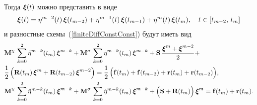 Тогда  $\boldsymbol{\mathbf{\xi}}(t)$ можно представить в виде
\begin{equation*}
	\boldsymbol{\mathbf{\xi}}(t) = \eta^{m-2}(t) \, \boldsymbol{\mathbf{\xi}}(t_{m-2}) + \eta^{m-1}(t) \, \boldsymbol{\mathbf{\xi}}(t_{m-1}) + \eta^{m}(t) \, \boldsymbol{\mathbf{\xi}}(t_{m}), \quad t \in \left[ t_{m-2}, \, t_{m} \right]
\end{equation*} 
и разностные схемы~(\ref{finiteDiffConstConst}) будут иметь вид
\begin{subequations}
	\label{finiteDiffConst}
	\begin{align}
		&
		\boldsymbol{\mathbf{M}}^\chi \, \sum_{k=0}^2 \ddot{\eta}^{m-k}(t_m) \, \boldsymbol{\mathbf{\xi}}^{m-k} +
		\boldsymbol{\mathbf{M}}^\sigma \, \sum_{k=0}^2 \dot{\eta}^{m-k}(t_m) \, \boldsymbol{\mathbf{\xi}}^{m-k} +
		\boldsymbol{\mathbf{S}} \, \frac{\boldsymbol{\mathbf{\xi}}^m + \boldsymbol{\mathbf{\xi}}^{m-2}}{2} + \nonumber \\
		&
		\frac{1}{2} \, \Big( \boldsymbol{\mathbf{R}}(t_m) \, \boldsymbol{\mathbf{\xi}}^m + \boldsymbol{\mathbf{R}}(t_{m-2}) \, \boldsymbol{\mathbf{\xi}}^{m-2} \Big)
		= 
		\frac{1}{2} \, \Big( \boldsymbol{\mathbf{f}}(t_m) + \boldsymbol{\mathbf{f}}(t_{m-2}) + \boldsymbol{\mathbf{r}}(t_m) + \boldsymbol{\mathbf{r}}(t_{m-2}) \Big), \label{CN3} \\
		&
		\boldsymbol{\mathbf{M}}^\chi \, \sum_{k=0}^2 \ddot{\eta}^{m-k}(t_m) \, \boldsymbol{\mathbf{\xi}}^{m-k} +
		\boldsymbol{\mathbf{M}}^\sigma \, \sum_{k=0}^2 \dot{\eta}^{m-k}(t_m) \, \boldsymbol{\mathbf{\xi}}^{m-k} +
		\Big( \boldsymbol{\mathbf{S}} + \boldsymbol{\mathbf{R}}(t_m) \Big) \, \boldsymbol{\mathbf{\xi}}^m 
		= 
		\boldsymbol{\mathbf{f}}(t_m) + \boldsymbol{\mathbf{r}}(t_m). \label{BDF3}
	\end{align}
\end{subequations}

